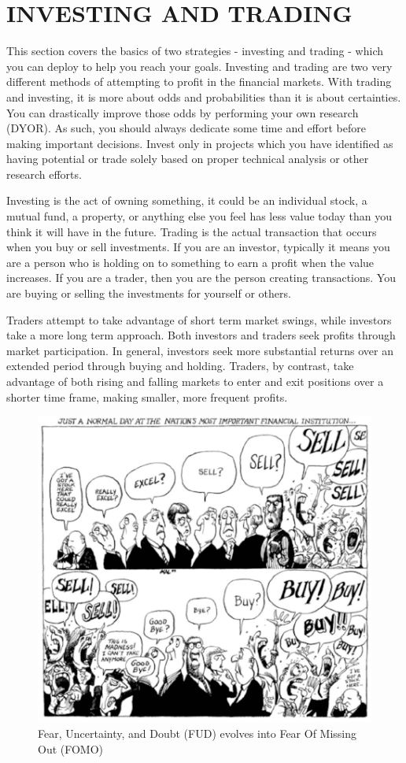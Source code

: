 \chapter{INVESTING AND TRADING}
\label{ch:investing}

This section covers the basics of two strategies - investing and trading - which you can deploy to help you reach your goals. Investing and trading are two very different methods of attempting to profit in the financial markets. With trading and investing, it is more about odds and probabilities than it is about certainties. You can drastically improve those odds by performing your own research (DYOR). As such, you should always dedicate some time and effort before making important decisions. Invest only in projects which you have identified as having potential or trade solely based on proper technical analysis or other research efforts.\medskip

Investing is the act of owning something, it could be an individual stock, a mutual fund, a property, or anything else you feel has less value today than you think it will have in the future. Trading is the actual transaction that occurs when you buy or sell investments. If you are an investor, typically it means you are a person who is holding on to something to earn a profit when the value increases. If you are a trader, then you are the person creating transactions. You are buying or selling the investments for yourself or others.

Traders attempt to take advantage of short term market swings, while investors take a more long term approach. Both investors and traders seek profits through market participation. In general, investors seek more substantial returns over an extended period through buying and holding. Traders, by contrast, take advantage of both rising and falling markets to enter and exit positions over a shorter time frame, making smaller, more frequent profits.

\begin{figure}
    \centering
    \includegraphics[width=.6\textwidth]{img/ch-investing/FOMOFUD.png}
    \caption{Fear, Uncertainty, and Doubt (FUD) evolves into Fear Of Missing Out (FOMO)}
    \label{fig:FOMOFUD}
\end{figure}

